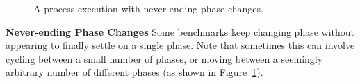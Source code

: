 \documentclass[a4paper,UKenglish]{lipics}
\begin{document}
\begin{figure}[tbp]
\caption{A process execution with never-ending phase changes.}
\label{fig:examples:neverending}
\end{figure}

\textbf{Never-ending Phase Changes} \label{sub:long}
Some benchmarks keep changing phase without appearing to finally settle on a
single phase. Note that sometimes this can involve cycling between a small
number of phases, or moving between a seemingly arbitrary number of different
phases (as shown in Figure~\ref{fig:examples:neverending}).
\end{document}
